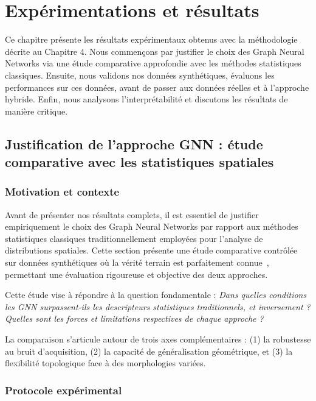
\chapter{Expérimentations et résultats}

Ce chapitre présente les résultats expérimentaux obtenus avec la méthodologie décrite au Chapitre 4. Nous commençons par justifier le choix des Graph Neural Networks via une étude comparative approfondie avec les méthodes statistiques classiques. Ensuite, nous validons nos données synthétiques, évaluons les performances sur ces données, avant de passer aux données réelles et à l'approche hybride. Enfin, nous analysons l'interprétabilité et discutons les résultats de manière critique.

\section{Justification de l'approche GNN : étude comparative avec les statistiques spatiales}

\subsection{Motivation et contexte}

Avant de présenter nos résultats complets, il est essentiel de justifier empiriquement le choix des Graph Neural Networks par rapport aux méthodes statistiques classiques traditionnellement employées pour l'analyse de distributions spatiales. Cette section présente une étude comparative contrôlée sur données synthétiques où la vérité terrain est parfaitement connue~\cite{Martin2025GRETSI2}, permettant une évaluation rigoureuse et objective des deux approches.

Cette étude vise à répondre à la question fondamentale : \textit{Dans quelles conditions les GNN surpassent-ils les descripteurs statistiques traditionnels, et inversement ? Quelles sont les forces et limitations respectives de chaque approche ?}

La comparaison s'articule autour de trois axes complémentaires : (1) la robustesse au bruit d'acquisition, (2) la capacité de généralisation géométrique, et (3) la flexibilité topologique face à des morphologies variées.

\subsection{Protocole expérimental}

